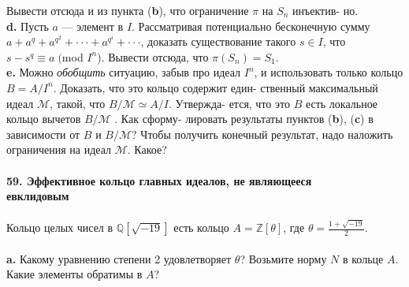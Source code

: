 \documentclass{mai_book}
\begin{document}
Вывести отсюда и из пункта (\textbf{b}), что ограничение $\pi$ на $S_n$ инъектив-\linebreak
но.
\\
\hspace*{10pt}\textbf{d.} Пусть $a$ — элемент в $I$. Рассматривая потенциально бесконечную\linebreak
сумму $a+a^q+a^{q^2}+\cdot\cdot\cdot+ a^{q^i}+\cdot\cdot\cdot$, доказать существование такого $s\in I$,\linebreak
что $s-s^q\equiv a\;($mod $I^n$). Вывести отсюда, что $\pi(S_n)=S_1$.
\\
\hspace*{10pt}\textbf{e.} Можно \textit{обобщить} ситуацию, забыв про идеал $I^n$, и использовать\linebreak
только кольцо $B=A/I^n$. Доказать, что это кольцо содержит един-\linebreak
ственный максимальный идеал $\mathcal{M}$, такой, что $B/\mathcal{M}\simeq A/I$. Утвержда-\linebreak
ется, что это $B$ есть локальное кольцо вычетов $B/\mathcal{M}$ . Как сформу-\linebreak
лировать результаты пунктов (\textbf{b}), (\textbf{c}) в зависимости от $B$ и $B/\mathcal{M}$?\linebreak
Чтобы получить конечный результат, надо наложить ограничения на\linebreak
идеал $\mathcal{M}$. Какое?
\\
\\
\noindent\textbf{59. Эффективное кольцо главных идеалов, не являющееся\\
евклидовым}\\\\
\hspace*{10pt} Кольцо целых чисел в $\mathbb{Q}[\sqrt{-19}]$ есть кольцо $A=\mathbb{Z}[\theta]$, где $\theta=\frac{1+\sqrt{-19}}{2}$.
\\\\
\hspace*{10pt}\textbf{a.} Какому уравнению степени 2 удовлетворяет $\theta$? Возьмите норму\linebreak
$N$ в кольце $A$. Какие элементы обратимы в $A$?\pagebreak

\end{document}
